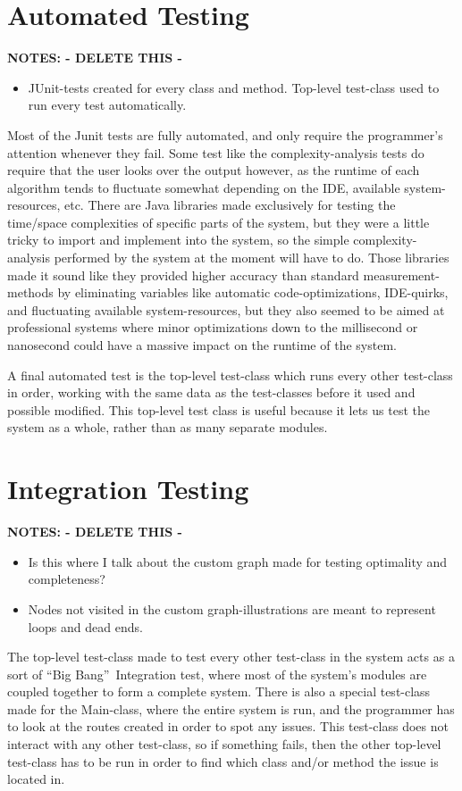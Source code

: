 \section{Automated Testing}
\textbf{NOTES: - DELETE THIS -}
\begin{itemize}
	\item JUnit-tests created for every class and method. Top-level test-class used to run every test automatically.
\end{itemize}

Most of the Junit tests are fully automated, and only require the programmer's attention whenever they fail. Some test like the complexity-analysis tests do require that the user looks over the output however, as the runtime of each algorithm tends to fluctuate somewhat depending on the IDE, available system-resources, etc. There are Java libraries made exclusively for testing the time/space complexities of specific parts of the system, but they were a little tricky to import and implement into the system, so the simple complexity-analysis performed by the system at the moment will have to do. Those libraries made it sound like they provided higher accuracy than standard measurement-methods by eliminating variables like automatic code-optimizations, IDE-quirks, and fluctuating available system-resources, but they also seemed to be aimed at professional systems where minor optimizations down to the millisecond or nanosecond could have a massive impact on the runtime of the system.

A final automated test is the top-level test-class which runs every other test-class in order, working with the same data as the test-classes before it used and possible modified. This top-level test class is useful because it lets us test the system as a whole, rather than as many separate modules.

\section{Integration Testing}
\textbf{NOTES: - DELETE THIS -}
\begin{itemize}
	\item Is this where I talk about the custom graph made for testing optimality and completeness?
	\item Nodes not visited in the custom graph-illustrations are meant to represent loops and dead ends.
\end{itemize}

The top-level test-class made to test every other test-class in the system acts as a sort of \textquotedblleft Big Bang\textquotedblright~Integration test, where most of the system's modules are coupled together to form a complete system. There is also a special test-class made for the Main-class, where the entire system is run, and the programmer has to look at the routes created in order to spot any issues. This test-class does not interact with any other test-class, so if something fails, then the other top-level test-class has to be run in order to find which class and/or method the issue is located in.


